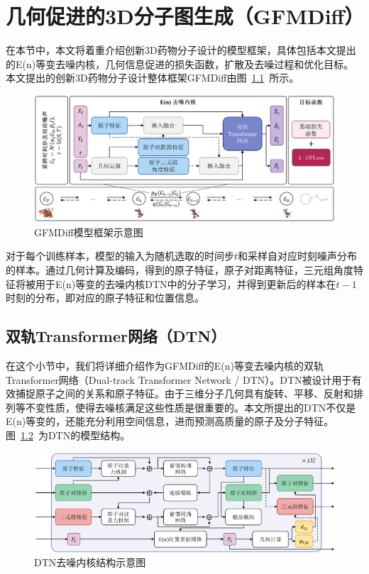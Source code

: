 \chapter{几何促进的3D分子图生成（GFMDiff）}
\label{chap:gfmdiff}

在本节中，本文将着重介绍创新3D药物分子设计的模型框架，具体包括本文提出的E(n)等变去噪内核，几何信息促进的损失函数，扩散及去噪过程和优化目标。本文提出的创新3D药物分子设计整体框架GFMDiff由图~\ref{fig:gfmdiff}~所示。

\begin{figure}[h]
    \centering
    \includegraphics[width=\linewidth]{figures/overview_gfmdiff.png}
    \caption{GFMDiff模型框架示意图}
    \label{fig:gfmdiff}
\end{figure} 

对于每个训练样本，模型的输入为随机选取的时间步$t$和采样自对应时刻噪声分布的样本。通过几何计算及编码，得到的原子特征，原子对距离特征，三元组角度特征将被用于E(n)等变的去噪内核DTN中的分子学习，并得到更新后的样本在$t-1$时刻的分布，即对应的原子特征和位置信息。

\section{双轨Transformer网络（DTN）}

在这个小节中，我们将详细介绍作为GFMDiff的E(n)等变去噪内核的双轨Transformer网络（Dual-track Transformer Network / DTN）。DTN被设计用于有效捕捉原子之间的关系和原子特征。由于三维分子几何具有旋转、平移、反射和排列等不变性质，使得去噪核满足这些性质是很重要的。本文所提出的DTN不仅是E(n)等变的，还能充分利用空间信息，进而预测高质量的原子及分子特征。图~\ref{fig:dtn}~为DTN的模型结构。

\begin{figure}[h]
  \centering
  \includegraphics[width=\linewidth]{figures/structure_dtn.png}
  \caption{DTN去噪内核结构示意图}
  \label{fig:dtn}
\end{figure}

